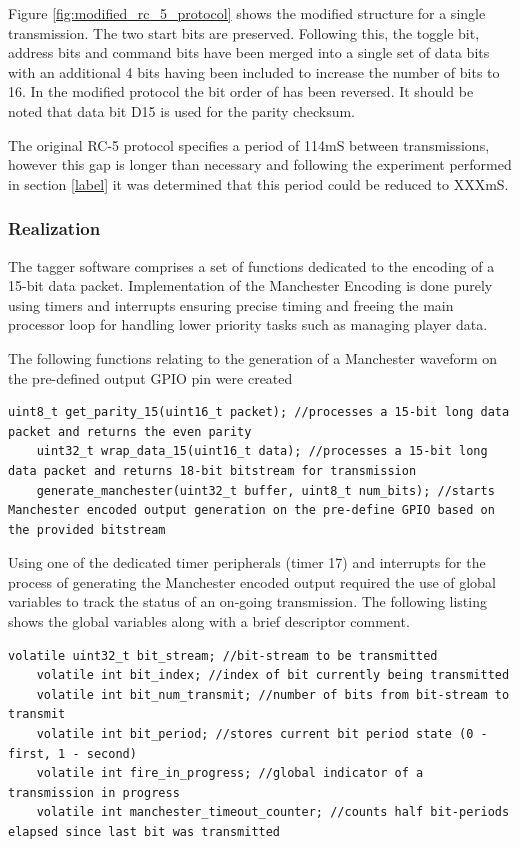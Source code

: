Figure \ref{fig:modified_rc_5_protocol} shows the modified structure for a single transmission. The two start bits are preserved. Following this, the toggle bit, address bits and command bits have been merged into a single set of data bits with an additional 4 bits having been included to increase the number of bits to 16. In the modified protocol the bit order of has been reversed. It should be noted that data bit D15 is used for the parity checksum.

The original RC-5 protocol specifies a period of 114mS between transmissions, however this gap is longer than necessary and following the experiment performed in section \ref{label} it was determined that this period could be reduced to XXXmS.

\subsubsection{Realization}

The tagger software comprises a set of functions dedicated to the encoding of a 15-bit data packet. Implementation of the Manchester Encoding is done purely using timers and interrupts ensuring precise timing and freeing the main processor loop for handling lower priority tasks such as managing player data.

The following functions relating to the generation of a Manchester waveform on the pre-defined output GPIO pin were created

\begin{lstlisting}[style=cstyle, caption=Transmission Related Functions\label{transmission_related_functions}]
	uint8_t get_parity_15(uint16_t packet); //processes a 15-bit long data packet and returns the even parity
	uint32_t wrap_data_15(uint16_t data); //processes a 15-bit long data packet and returns 18-bit bitstream for transmission
	generate_manchester(uint32_t buffer, uint8_t num_bits); //starts Manchester encoded output generation on the pre-define GPIO based on the provided bitstream
\end{lstlisting}

Using one of the dedicated timer peripherals (timer 17) and interrupts for the process of generating the Manchester encoded output required the use of global variables to track the status of an on-going transmission. The following listing shows the global variables along with a brief descriptor comment.

\begin{lstlisting}[style=cstyle, caption=Transmission Status Tracking Variables\label{lst:transmission_status_tracking_variables}]
	volatile uint32_t bit_stream; //bit-stream to be transmitted
	volatile int bit_index; //index of bit currently being transmitted
	volatile int bit_num_transmit; //number of bits from bit-stream to transmit
	volatile int bit_period; //stores current bit period state (0 - first, 1 - second)
	volatile int fire_in_progress; //global indicator of a transmission in progress
	volatile int manchester_timeout_counter; //counts half bit-periods elapsed since last bit was transmitted
\end{lstlisting}

